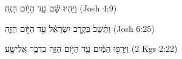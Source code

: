 
\begin{exe}

\ex\label{antdur_result_state_exs1}
\texthebrew{
וַיִּ֣הְיוּ שָׁ֔ם עַ֖ד הַיֹּ֥ום הַזֶּֽה׃ 
} (Josh 4:9)

\ex\label{antdur_result_state_exs2}
\texthebrew{
וַתֵּ֨שֶׁב֙ בְּקֶ֣רֶב יִשְׂרָאֵ֔ל עַ֖ד הַיֹּ֣ום הַזֶּ֑ה 
} (Josh 6:25)

\ex\label{antdur_result_state_exs3}
\texthebrew{
וַיֵּרָפ֣וּ הַמַּ֔יִם עַ֖ד הַיֹּ֣ום הַזֶּ֑ה כִּדְבַ֥ר אֱלִישָׁ֖ע 
} (2 Kgs 2:22)

\end{exe}
